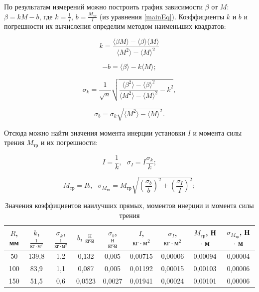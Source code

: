 \documentclass[a4paper,12pt]{article} %
\begin{document}
По результатам измерений можно построить график зависимости $ \beta $ от $ M $: $ \beta = kM - b $, где $ k = \frac{1}{I} $, $ b = \frac{M_\text{тр}}{I} $ (из уравнения \eqref{mainEq}). Коэффициенты $ k $ и $ b $ и погрешности их вычисления определим методом наименьших квадратов:

\begin{equation}
    k = \frac{\langle \beta M \rangle - \langle \beta \rangle \langle M \rangle}{\langle M^2 \rangle - \langle M \rangle^2} 
\end{equation}

\begin{equation}
    -b = \langle \beta \rangle - k \langle M \rangle ;
\end{equation}

\begin{equation}
    \sigma_k = \frac{1}{\sqrt{n}} \sqrt{\frac{\langle \beta^2 \rangle - \langle \beta \rangle^2}{\langle M^2 \rangle - \langle M \rangle^2} - k^2},
\end{equation}

\begin{equation}
    \sigma_b = \sigma_k \sqrt{\langle M^2 \rangle - \langle M \rangle^2}.
\end{equation}

Отсюда можно найти значения момента инерции установки $ I $ и момента силы трения $ M_\text{тр} $ и их погрешности:

\begin{equation}
    I = \frac{1}{k}, \text{    } \sigma_I = I \frac{\sigma_k}{k};
\end{equation}

\begin{equation}
    M_\text{тр} = Ib, \text{    } \sigma_{M_\text{тр}} = M_\text{тр} \sqrt{(\frac{\sigma_b}{b})^2 + (\frac{\sigma_I}{I})^2};
\end{equation}

\begin{table}[h]
    \centering
    \begin{tabular}{|c|c|c|c|c|c|c|c|c|} \hline
        $ R $, мм & $ k $, $ \frac{1}{\text{кг} \cdot \text{м}^2} $ & $ \sigma_k $, $ \frac{1}{\text{кг} \cdot \text{м}^2} $ & $ b $, $ \frac{\text{Н}}{\text{кг} \cdot \text{м}} $ & $\sigma_b $, $ \frac{\text{Н}}{\text{кг} \cdot \text{м}} $ & $ I $, $ \text{кг} \cdot \text{м}^2 $ & $ \sigma_I $, $ \text{кг} \cdot \text{м}^2 $ & $ M_\text{тр} $, Н $ \cdot $ м & $ \sigma_{M_\text{тр}} $, Н $ \cdot $ м \\ [5pt]\hline
        50 & 139,8 & 1,2 & 0,132 & 0,005 & 0,00715 & 0,00006 & 0,00094 & 0,00004 \\ \hline
        100 & 83,9 & 1,1 & 0,087 & 0,005 & 0,01192 & 0,00015 & 0,00103 & 0,00006 \\ \hline
        150 & 51,5 & 0,6 & 0,0523 & 0,0027 & 0,01941 & 0,00024 & 0,00101 & 0,00006 \\ \hline
    \end{tabular}
    \caption{Значения коэффициентов наилучших прямых, моментов инерции и момента силы трения}
    \label{tab:res2}
\end{table}
\end{document}
